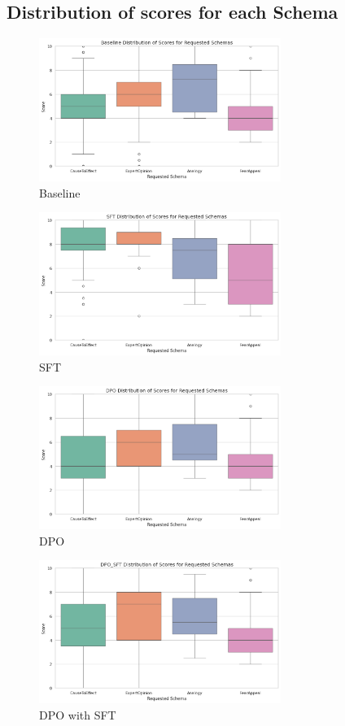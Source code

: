 \documentclass[11pt]{article}
\begin{document}
\subsection{Distribution of scores for each Schema}
\label{sub: distribution of schema score}
\begin{figure}[H]
  \centering
  \includegraphics[width=0.7\textwidth]{images/base_dis.png}
    \caption{Baseline}
\end{figure}
\begin{figure}[H]
  \centering
  \includegraphics[width=0.7\textwidth]{images/sft_dis.png}
    \caption{SFT}
\end{figure}
\begin{figure}[H]
  \centering
  \includegraphics[width=0.7\textwidth]{images/dpo_dis.png}
    \caption{DPO}
\end{figure}
\begin{figure}[H]
  \centering
  \includegraphics[width=0.7\textwidth]{images/dpo_sft_dis.png}
    \caption{DPO with SFT}
\end{figure}
\end{document}
